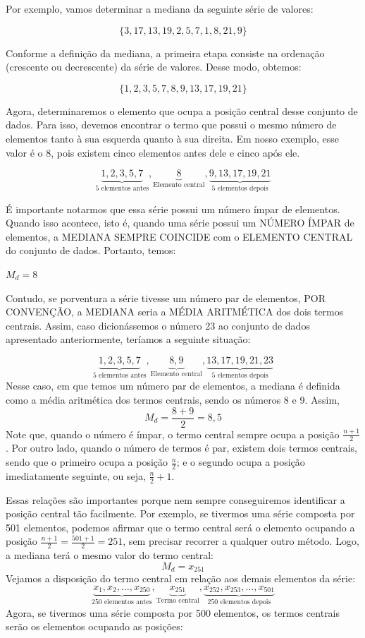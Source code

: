Por exemplo, vamos determinar a mediana da seguinte série de valores:

\[
    \{3, 17, 13, 19, 2, 5, 7, 1, 8, 21, 9\}
\]

Conforme a definição da mediana, a primeira etapa consiste na ordenação (crescente ou decrescente) da série de valores. Desse modo, obtemos:

\[
    \{1, 2, 3, 5, 7, 8, 9, 13, 17, 19, 21\}
\]

Agora, determinaremos o elemento que ocupa a posição central desse conjunto de dados. Para isso, devemos encontrar o termo que possui o mesmo número de elementos tanto à sua esquerda quanto à sua direita. Em nosso exemplo, esse valor é o 8, pois existem cinco elementos antes dele e cinco após ele.

\[
    \underbrace{1, 2, 3, 5, 7}_{\text{5 elementos antes}}, \underbrace{8}_{\text{Elemento central}}, \underbrace{9, 13, 17, 19, 21}_{\text{5 elementos depois}}
\]

É importante notarmos que essa série possui um número ímpar de elementos. Quando isso acontece, isto é, quando uma série possui um NÚMERO ÍMPAR de elementos, a MEDIANA SEMPRE COINCIDE com o ELEMENTO CENTRAL do conjunto de dados. Portanto, temos:

\begin{center}
    \(M_d=8\)
\end{center}
Contudo, se porventura a série tivesse um número par de elementos, POR CONVENÇÃO, a MEDIANA seria a MÉDIA ARITMÉTICA dos dois termos centrais. Assim, caso dicionássemos o número 23 ao conjunto de dados apresentado anteriormente, teríamos a seguinte situação:

\[
    \underbrace{1, 2, 3, 5, 7}_{\text{5 elementos antes}}, \underbrace{8, 9}_{\text{Elemento central}}, \underbrace{ 13, 17, 19, 21, 23}_{\text{5 elementos depois}}
\]
Nesse caso, em que temos um número par de elementos, a mediana é definida como a média aritmética dos termos centrais, sendo os números 8 e 9. Assim,
\[
    M_d=\frac{8+9}{2}=8,5
\]
Note que, quando o número é ímpar, o termo central sempre ocupa a posição \(\frac{n+1}{2}\). Por outro lado, quando o número de termos é par, existem dois termos centrais, sendo que o primeiro ocupa a posição \(\frac{n}{2}\); e o
segundo ocupa a posição imediatamente seguinte, ou seja, \(\frac{n}{2}+1\).

Essas relações são importantes porque nem sempre conseguiremos identificar a posição central tão facilmente. Por exemplo, se tivermos uma série composta por 501 elementos, podemos afirmar que o termo central será o elemento ocupando a posição \(\frac{n+1}{2}=\frac{501+1}{2}=251\), sem precisar recorrer a qualquer outro
método. Logo, a mediana terá o mesmo valor do termo central:
\[
    M_d=x_{251}
\]
Vejamos a disposição do termo central em relação aos demais elementos da série:
\[
    \underbrace{x_1, x_2, \dots, x_{250}}_{\text{250 elementos antes}}, \underbrace{x_{251}}_{\text{Termo central}}, \underbrace{ x_{252}, x_{253}, \dots, x_{501}}_{\text{250 elementos depois}}
\]
Agora, se tivermos uma série composta por 500 elementos, os termos centrais serão os elementos ocupando as posições:

